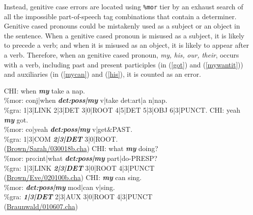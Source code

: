 Instead, genitive case errors are located using \texttt{\%mor} tier by an exhaust search of all the impossible part-of-speech tag combinations that contain a determiner. Genitive cased pronouns could be mistakenly used as a subject or an object in the sentence. When a genitive cased pronoun is misused as a subject, it is likely to precede a verb; and when it is misused as an object, it is likely to appear after a verb. Therefore, when an genitive cased pronoun, \textit{my, his, our, their}, occurs with a verb, including past and present participles (in (\ref{got}) and (\ref{mywantit})) and auxiliaries (in (\ref{mycan}) and (\ref{his}), it is counted as an error. 

\begin{exe}
\ex \label{} \gll *CHI:	when \textit{\textbf{my}} take a nap. \\
\%mor:	conj|when \textit{\textbf{det:poss|my}} v|take det:art|a n|nap.\\
\%gra:	1|3|LINK 2|3|DET 3|0|ROOT 4|5|DET 5|3|OBJ 6|3|PUNCT.
\ex \label{got} \gll *CHI: yeah \textit{\textbf{my}} got.\\
\%mor: co|yeah \textit{\textbf{det:poss|my}} v|get&PAST.\\
\%gra: 1|3|COM \textit{\textbf{2|3|DET }} 3|0|ROOT.\\
(\href{https://childes.talkbank.org/browser/index.php?url=Eng-NA/Brown/Sarah/030018b.cha}{Brown/Sarah/030018b.cha})
\ex \label{mywantit} \gll  *CHI: what \textit{\textbf{my}}  doing?  \\     
\%mor:	pro:int|what \textit{\textbf{det:poss|my}} part|do-PRESP?\\
\%gra:	1|3|LINK \textit{\textbf{2|3|DET}} 3|0|ROOT 4|3|PUNCT\\
(\href{https://childes.talkbank.org/browser/index.php?url=Eng-NA/Brown/Eve/020100b.cha}{Brown/Eve/020100b.cha})
\ex \label{mycan} \gll *CHI: \textit{\textbf{my}} can sing.\\
\%mor: \textbf{\textit{det:poss|my}} mod|can v|sing.\\
\%gra: \textit{\textbf{1|3|DET}} 2|3|AUX 3|0|ROOT 4|3|PUNCT\\
(\href{https://childes.talkbank.org/browser/index.php?url=Eng-NA/Braunwald/010607.cha}{Braunwald/010607.cha})


\end{exe}
